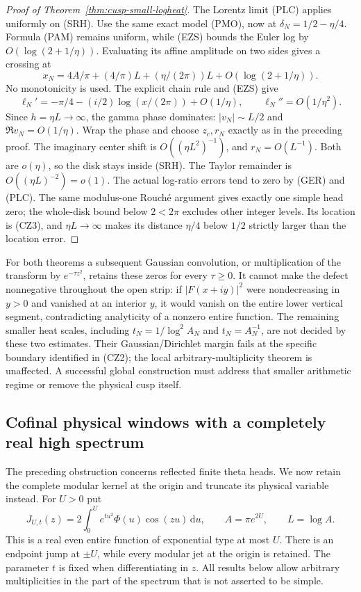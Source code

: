 \documentclass[11pt]{article}
\theoremstyle{remark}\newtheorem{remark}[theorem]{Remark}
\newcommand{\dd}{\,\mathrm d}
\begin{document}
\begin{proof}[Proof of Theorem~\ref{thm:cusp-small-logheat}]
The Lorentz limit (PLC) applies uniformly on (SRH).
Use the same exact model (PMO), now at $\delta_N=1/2-\eta/4$.
Formula (PAM) remains uniform, while (EZS) bounds the Euler log by
$O(\log(2+1/\eta))$. Evaluating its affine amplitude on two sides
gives a crossing at
\[
 x_N=4A/\pi+(4/\pi)L+(\eta/(2\pi))L
                         +O(\log(2+1/\eta)).
\]
No monotonicity is used. The explicit chain rule and (EZS) give
\[
 \ell_N'=-\pi/4-(i/2)\log(x/(2\pi))+O(1/\eta),
 \qquad \ell_N''=O(1/\eta^2).                         \tag{GPD}
\]
Since $h=\eta L\to\infty$, the gamma phase dominates:
$|v_N|\sim L/2$ and $\Re v_N=O(1/\eta)$.
Wrap the phase and choose $z_c,r_N$ exactly as in the preceding
proof. The imaginary center shift is $O((\eta L^2)^{-1})$,
and $r_N=O(L^{-1})$. Both are $o(\eta)$, so the disk stays
inside (SRH). The Taylor remainder is $O((\eta L)^{-2})=o(1)$.
The actual log-ratio errors tend to zero by (GER) and (PLC).
The same modulus-one Rouch\'e argument gives exactly one simple head
zero; the whole-disk bound below $2<2\pi$ excludes other integer
levels. Its location is (CZ3), and $\eta L\to\infty$ makes its
distance $\eta/4$ below $1/2$ strictly larger than the location error.
\end{proof}

For both theorems a subsequent Gaussian convolution, or multiplication
of the transform by $e^{-\tau z^2}$, retains these zeros for every
$\tau\ge0$. It cannot make the defect nonnegative throughout the
open strip: if $|F(x+iy)|^2$ were nondecreasing in $y>0$ and vanished
at an interior $y$, it would vanish on the entire lower vertical
segment, contradicting analyticity of a nonzero entire function.
The remaining smaller heat scales, including $t_N=1/\log^2A_N$
and $t_N=A_N^{-1}$, are not decided by these two estimates.
Their Gaussian/Dirichlet margin fails at the specific boundary
identified in (CZ2); the local arbitrary-multiplicity theorem is
unaffected. A successful global construction must address that smaller
arithmetic regime or remove the physical cusp itself.

\subsection{Cofinal physical windows with a completely real high spectrum}
\label{subsec:physical-windows}

The preceding obstruction concerns reflected finite theta heads. We now
retain the complete modular kernel at the origin and truncate its physical
variable instead. For $U>0$ put
\[
 J_{U,t}(z)=2\int_0^U e^{tu^2}\Phi(u)\cos(zu)\dd u,
 \qquad A=\pi e^{2U},\qquad L=\log A.                 \tag{PW1}
\]
This is a real even entire function of exponential type at most $U$.
There is an endpoint jump at $\pm U$, while every modular jet at the
origin is retained. The parameter $t$ is fixed when differentiating in
$z$. All results below allow arbitrary multiplicities in the part of the
spectrum that is not asserted to be simple.
\end{document}
